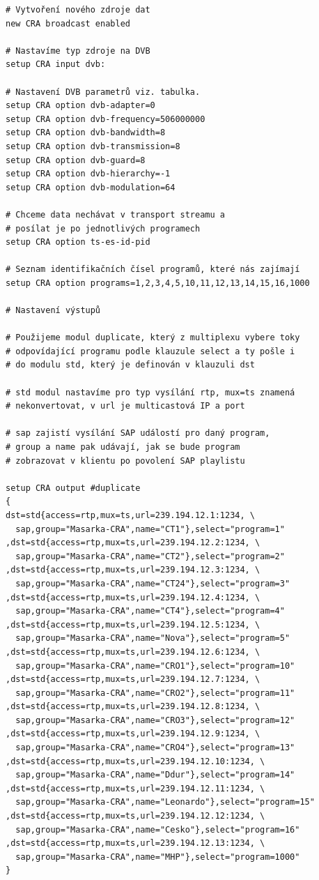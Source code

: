 \vspace{10pt}

\begin{small}
\begin{verbatim}
# Vytvoření nového zdroje dat
new CRA broadcast enabled

# Nastavíme typ zdroje na DVB
setup CRA input dvb:

# Nastavení DVB parametrů viz. tabulka.
setup CRA option dvb-adapter=0
setup CRA option dvb-frequency=506000000
setup CRA option dvb-bandwidth=8
setup CRA option dvb-transmission=8
setup CRA option dvb-guard=8
setup CRA option dvb-hierarchy=-1
setup CRA option dvb-modulation=64

# Chceme data nechávat v transport streamu a 
# posílat je po jednotlivých programech
setup CRA option ts-es-id-pid

# Seznam identifikačních čísel programů, které nás zajímají
setup CRA option programs=1,2,3,4,5,10,11,12,13,14,15,16,1000

# Nastavení výstupů

# Použijeme modul duplicate, který z multiplexu vybere toky
# odpovídající programu podle klauzule select a ty pošle i
# do modulu std, který je definován v klauzuli dst

# std modul nastavíme pro typ vysílání rtp, mux=ts znamená
# nekonvertovat, v url je multicastová IP a port

# sap zajistí vysílání SAP událostí pro daný program,
# group a name pak udávají, jak se bude program
# zobrazovat v klientu po povolení SAP playlistu

setup CRA output #duplicate
{
dst=std{access=rtp,mux=ts,url=239.194.12.1:1234, \
  sap,group="Masarka-CRA",name="CT1"},select="program=1"
,dst=std{access=rtp,mux=ts,url=239.194.12.2:1234, \
  sap,group="Masarka-CRA",name="CT2"},select="program=2"
,dst=std{access=rtp,mux=ts,url=239.194.12.3:1234, \ 
  sap,group="Masarka-CRA",name="CT24"},select="program=3"
,dst=std{access=rtp,mux=ts,url=239.194.12.4:1234, \
  sap,group="Masarka-CRA",name="CT4"},select="program=4"
,dst=std{access=rtp,mux=ts,url=239.194.12.5:1234, \
  sap,group="Masarka-CRA",name="Nova"},select="program=5"
,dst=std{access=rtp,mux=ts,url=239.194.12.6:1234, \
  sap,group="Masarka-CRA",name="CRO1"},select="program=10"
,dst=std{access=rtp,mux=ts,url=239.194.12.7:1234, \
  sap,group="Masarka-CRA",name="CRO2"},select="program=11"
,dst=std{access=rtp,mux=ts,url=239.194.12.8:1234, \
  sap,group="Masarka-CRA",name="CRO3"},select="program=12"
,dst=std{access=rtp,mux=ts,url=239.194.12.9:1234, \
  sap,group="Masarka-CRA",name="CRO4"},select="program=13"
,dst=std{access=rtp,mux=ts,url=239.194.12.10:1234, \
  sap,group="Masarka-CRA",name="Ddur"},select="program=14"
,dst=std{access=rtp,mux=ts,url=239.194.12.11:1234, \
  sap,group="Masarka-CRA",name="Leonardo"},select="program=15"
,dst=std{access=rtp,mux=ts,url=239.194.12.12:1234, \
  sap,group="Masarka-CRA",name="Cesko"},select="program=16"
,dst=std{access=rtp,mux=ts,url=239.194.12.13:1234, \
  sap,group="Masarka-CRA",name="MHP"},select="program=1000"
}
\end{verbatim}
\end{small}

